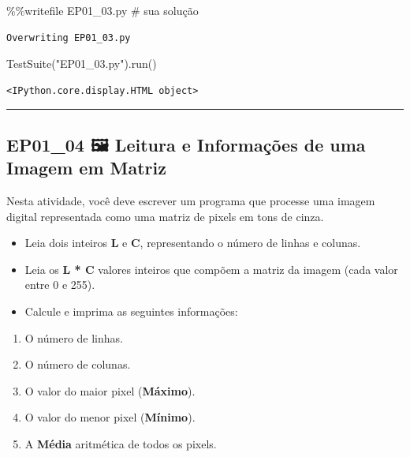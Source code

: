 \documentclass[
  portuguese,
  letterpaper,
  openany,
  oneside,
  12pt,
  a4paper]{book}
\newenvironment{Shaded}{\begin{snugshade}}{\end{snugshade}}
\newcommand{\CommentTok}[1]{\textcolor[rgb]{0.37,0.37,0.37}{#1}}
\newcommand{\NormalTok}[1]{\textcolor[rgb]{0.00,0.23,0.31}{#1}}
\newcommand{\OperatorTok}[1]{\textcolor[rgb]{0.37,0.37,0.37}{#1}}
\newcommand{\StringTok}[1]{\textcolor[rgb]{0.13,0.47,0.30}{#1}}
\providecommand{\tightlist}{%
  \setlength{\itemsep}{0pt}\setlength{\parskip}{0pt}}
\begin{document}
\begin{Shaded}
\begin{Highlighting}[]
\OperatorTok{\%\%}\NormalTok{writefile EP01\_03.py}
\CommentTok{\# sua solução}
\end{Highlighting}
\end{Shaded}

\begin{verbatim}
Overwriting EP01_03.py
\end{verbatim}

\begin{Shaded}
\begin{Highlighting}[]
\NormalTok{TestSuite(}\StringTok{"EP01\_03.py"}\NormalTok{).run()}
\end{Highlighting}
\end{Shaded}

\begin{verbatim}
<IPython.core.display.HTML object>
\end{verbatim}

\begin{center}\rule{0.5\linewidth}{0.5pt}\end{center}

\subsection{EP01\_04 🖼️ Leitura e Informações de uma Imagem em
Matriz}\label{ep01_04-leitura-e-informauxe7uxf5es-de-uma-imagem-em-matriz}

Nesta atividade, você deve escrever um programa que processe uma imagem
digital representada como uma matriz de pixels em tons de cinza.

\begin{itemize}
\tightlist
\item
  Leia dois inteiros \textbf{L} e \textbf{C}, representando o número de
  linhas e colunas.
\item
  Leia os \textbf{L * C} valores inteiros que compõem a matriz da imagem
  (cada valor entre 0 e 255).
\item
  Calcule e imprima as seguintes informações:
\end{itemize}

\begin{enumerate}
\def\labelenumi{\arabic{enumi}.}
\tightlist
\item
  O número de linhas.
\item
  O número de colunas.
\item
  O valor do maior pixel (\textbf{Máximo}).
\item
  O valor do menor pixel (\textbf{Mínimo}).
\item
  A \textbf{Média} aritmética de todos os pixels.
\end{enumerate}
\end{document}
